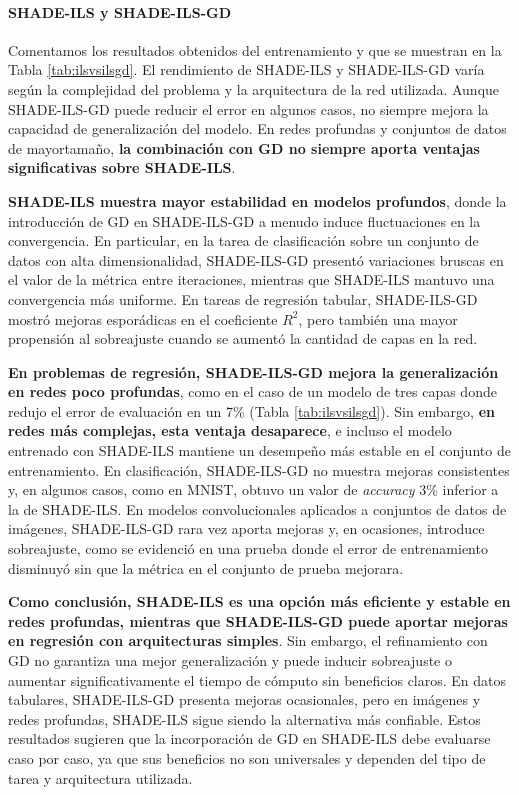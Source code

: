 \vspace{0.4cm}
\paragraph{SHADE-ILS y SHADE-ILS-GD\\} 

\mbox{}
\vspace{0.1cm}


Comentamos los resultados obtenidos del entrenamiento y que se muestran en la Tabla \ref{tab:ilsvsilsgd}. El rendimiento de SHADE-ILS y SHADE-ILS-GD varía según la complejidad del problema y la arquitectura de la red utilizada. Aunque SHADE-ILS-GD puede reducir el error en algunos casos, no siempre mejora la capacidad de generalización del modelo. En redes profundas y conjuntos de datos de mayortamaño,\textbf{ la combinación con GD no siempre aporta ventajas significativas sobre SHADE-ILS}.

\textbf{SHADE-ILS muestra mayor estabilidad en modelos profundos}, donde la introducción de GD en SHADE-ILS-GD a menudo induce fluctuaciones en la convergencia. En particular, en la tarea de clasificación sobre un conjunto de datos con alta dimensionalidad, SHADE-ILS-GD presentó variaciones bruscas en el valor de la métrica entre iteraciones, mientras que SHADE-ILS mantuvo una convergencia más uniforme. En tareas de regresión tabular, SHADE-ILS-GD mostró mejoras esporádicas en el coeficiente $R^2$, pero también una mayor propensión al sobreajuste cuando se aumentó la cantidad de capas en la red.

\textbf{En problemas de regresión, SHADE-ILS-GD mejora la generalización en redes poco profundas}, como en el caso de un modelo de tres capas donde redujo el error de evaluación en un 7\% (Tabla \ref{tab:ilsvsilsgd}). Sin embargo, \textbf{en redes más complejas, esta ventaja desaparece}, e incluso el modelo entrenado con SHADE-ILS mantiene un desempeño más estable en el conjunto de entrenamiento. En clasificación, SHADE-ILS-GD no muestra mejoras consistentes y, en algunos casos, como en MNIST, obtuvo un valor de \textit{accuracy} 3\% inferior a la de SHADE-ILS. En modelos convolucionales aplicados a conjuntos de datos de imágenes, SHADE-ILS-GD rara vez aporta mejoras y, en ocasiones, introduce sobreajuste, como se evidenció en una prueba donde el error de entrenamiento disminuyó sin que la métrica en el conjunto de prueba mejorara.

\textbf{Como conclusión, SHADE-ILS es una opción más eficiente y estable en redes profundas, mientras que SHADE-ILS-GD puede aportar mejoras en regresión con arquitecturas simples}. Sin embargo, el refinamiento con GD no garantiza una mejor generalización y puede inducir sobreajuste o aumentar significativamente el tiempo de cómputo sin beneficios claros. En datos tabulares, SHADE-ILS-GD presenta mejoras ocasionales, pero en imágenes y redes profundas, SHADE-ILS sigue siendo la alternativa más confiable. Estos resultados sugieren que la incorporación de GD en SHADE-ILS debe evaluarse caso por caso, ya que sus beneficios no son universales y dependen del tipo de tarea y arquitectura utilizada.



